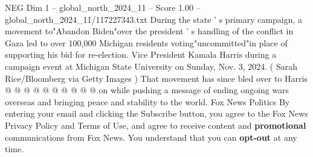 \begin{textsample}{NEG Dim 1 – global\_north\_2024\_11 – Score 1.00 – global\_north\_2024\_11/117227343.txt}
During the state ' s primary campaign, a movement to"Abandon Biden"over the president ' s handling of the conflict in Gaza led to over 100,000 Michigan residents voting"uncommitted"in place of supporting his bid for re-election.
Vice President Kamala Harris during a campaign event at Michigan State University on Sunday, Nov. 3, 2024. ( Sarah Rice/Bloomberg via Getty Images ) That movement has since bled over to Harris @ @ @ @ @ @ @ @ @ @ on while pushing a message of ending ongoing wars overseas and bringing peace and stability to the world.
Fox News Politics By entering your email and clicking the Subscribe button, you agree to the Fox News Privacy Policy and Terms of Use, and agree to receive content and \textbf{promotional} communications from Fox News.
You understand that you can \textbf{opt-out} at any time.

\end{textsample}
